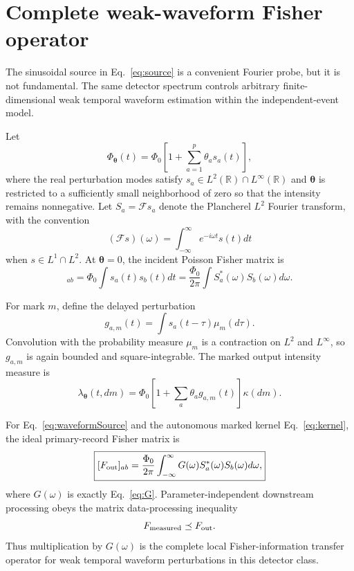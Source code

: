 \section{Complete weak-waveform Fisher operator}
\label{sec:waveform}

The sinusoidal source in Eq.~\eqref{eq:source} is a convenient Fourier probe, but it is not fundamental. The same detector spectrum controls arbitrary finite-dimensional weak temporal waveform estimation within the independent-event model.

Let
\begin{equation}
\Phi_{\boldsymbol\theta}(t)
=\Phi_0\left[1+\sum_{a=1}^{p}\theta_a s_a(t)\right],
\label{eq:waveformSource}
\end{equation}
where the real perturbation modes satisfy $s_a\in L^2(\mathbb R)\cap L^\infty(\mathbb R)$ and $\boldsymbol\theta$ is restricted to a sufficiently small neighborhood of zero so that the intensity remains nonnegative. Let $S_a=\mathcal F s_a$ denote the Plancherel $L^2$ Fourier transform, with the convention
\begin{equation}
(\mathcal F s)(\omega)=\int_{-\infty}^{\infty}e^{-i\omega t}s(t)dt
\end{equation}
when $s\in L^1\cap L^2$. At $\boldsymbol\theta=0$, the incident Poisson Fisher matrix is
\begin{equation}
[F_{\rm in}]_{ab}
=\Phi_0\int s_a(t)s_b(t)dt
=\frac{\Phi_0}{2\pi}
\int S_a^*(\omega)S_b(\omega)d\omega.
\label{eq:waveformInputFI}
\end{equation}

For mark $m$, define the delayed perturbation
\begin{equation}
g_{a,m}(t)
=\int s_a(t-\tau)\mu_m(d\tau).
\end{equation}
Convolution with the probability measure $\mu_m$ is a contraction on $L^2$ and $L^\infty$, so $g_{a,m}$ is again bounded and square-integrable. The marked output intensity measure is
\begin{equation}
\lambda_{\boldsymbol\theta}(t,dm)
=\Phi_0\left[1+\sum_a\theta_a g_{a,m}(t)\right]\kappa(dm).
\end{equation}

\begin{theorem}
For Eq.~\eqref{eq:waveformSource} and the autonomous marked kernel Eq.~\eqref{eq:kernel}, the ideal primary-record Fisher matrix is
\begin{equation}
\boxed{
[F_{\rm out}]_{ab}
=\frac{\Phi_0}{2\pi}
\int_{-\infty}^{\infty}
G(\omega)S_a^*(\omega)S_b(\omega)d\omega,}
\label{eq:waveformFI}
\end{equation}
where $G(\omega)$ is exactly Eq.~\eqref{eq:G}. Parameter-independent downstream processing obeys the matrix data-processing inequality
\begin{equation}
F_{\rm measured}\preceq F_{\rm out}.
\end{equation}
Thus multiplication by $G(\omega)$ is the complete local Fisher-information transfer operator for weak temporal waveform perturbations in this detector class.
\end{theorem}

